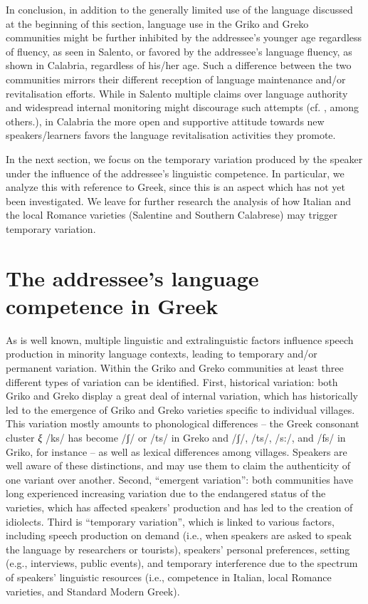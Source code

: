 \documentclass[output=paper,hidelinks]{langscibook}
\begin{document}
In conclusion, in addition to the generally limited use of the language discussed at the beginning of this section, language use in the Griko and Greko communities might be further inhibited by the addressee’s younger age regardless of fluency, as seen in Salento, or favored by the addressee’s language fluency, as shown in Calabria, regardless of his/her age. Such a difference between the two communities mirrors their different reception of language maintenance and/or revitalisation efforts. While in Salento multiple claims over language authority and widespread internal monitoring might discourage such attempts (cf. \citealt{RourkeRamallo2013, Costa2015, Sallabank2017, SallabankMarquis2018}, among others.), in Calabria the more open and supportive attitude towards new speakers/learners favors the language revitalisation activities they promote. 



In the next section, we focus on the temporary variation produced by the speaker under the influence of the addressee's linguistic competence. In particular, we analyze this with reference to Greek, since this is an aspect which has not yet been investigated. We leave for further research the analysis of how Italian and the local Romance varieties (Salentine and Southern Calabrese) may trigger temporary variation.



\section{The addressee's language competence in Greek}
\label{sec:key:4}

As is well known, multiple linguistic and extralinguistic factors influence speech production in minority language contexts, leading to temporary and/or permanent variation. Within the Griko and Greko communities at least three different types of variation can be identified. First, historical variation: both Griko and Greko display a great deal of internal variation, which has historically led to the emergence of Griko and Greko varieties specific to individual villages. This variation mostly amounts to phonological differences -- the Greek consonant cluster \textit{ξ} /ks/ has become /ʃ/ or /ts/ in Greko and /ʃ/, /ts/, /s:/, and /fs/ in Griko, for instance -- as well as lexical differences among villages. Speakers are well aware of these distinctions, and may use them to claim the authenticity of one variant over another. Second, ``emergent variation'': both communities have long experienced increasing variation due to the endangered status of the varieties, which has affected speakers’ production and has led to the creation of idiolects. Third is ``temporary variation'', which is linked to various factors, including speech production on demand (i.e., when speakers are asked to speak the language by researchers or tourists), speakers’ personal preferences, setting (e.g., interviews, public events), and temporary interference due to the spectrum of speakers’ linguistic resources (i.e., competence in Italian, local Romance varieties, and Standard Modern Greek). 
\end{document}
